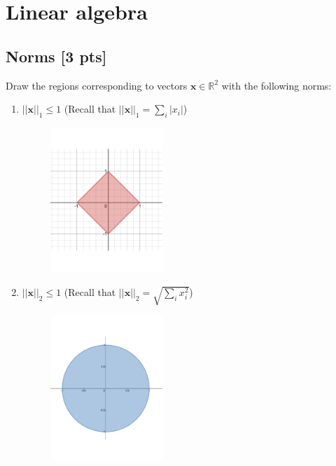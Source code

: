 \documentclass[a4paper]{article}
\theoremstyle{definition}
\newcommand{\RR}{\mathbb{R}}
\newenvironment{soln}{
    \leavevmode\color{blue}\ignorespaces
}{}
\begin{document}
\section{Linear algebra}


\subsection{Norms [3 pts]}
Draw the regions corresponding to vectors $\mathbf{x}\in\RR^2$ with the following norms:
\begin{enumerate}
	\item 	$||\mathbf{x}||_1\leq 1$ (Recall that $||\mathbf{x}||_1 = \sum_i |x_i|$)
	\begin{soln}
	    \begin{figure}[H]
	        \centering
	        \includegraphics[width=0.4\textwidth]{2.pdf}
	        \captionsetup{labelformat=empty}
	        \caption{}
	        \label{fig:my_label}
	    \end{figure}
	\end{soln}
	\item 	$||\mathbf{x}||_2 \leq 1$ (Recall that $||\mathbf{x}||_2 =\sqrt{\sum_i x_i^2}$)
	\begin{soln}
	    \begin{figure}[H]
	        \centering
	        \includegraphics[width=0.4\textwidth]{1.pdf}

\end{figure}
\end{soln}
\end{enumerate}
\end{document}
